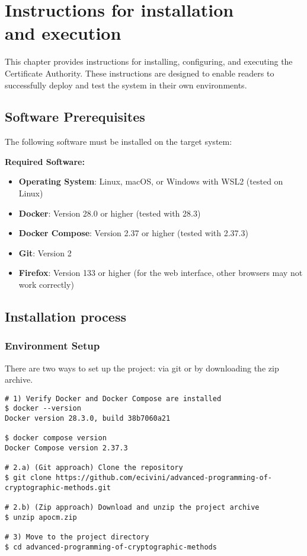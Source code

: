 \chapter{Instructions for installation \\and execution}

This chapter provides instructions for installing, configuring, and executing the 
Certificate Authority. These instructions are designed to enable readers to successfully 
deploy and test the system in their own environments.

\section{Software Prerequisites}

The following software must be installed on the target system:

\textbf{Required Software:}
\begin{itemize}
    \item \textbf{Operating System}: Linux, macOS, or Windows with WSL2 (tested on Linux)
    \item \textbf{Docker}: Version 28.0 or higher (tested with 28.3)
    \item \textbf{Docker Compose}: Version 2.37 or higher (tested with 2.37.3)
    \item \textbf{Git}: Version 2
    \item \textbf{Firefox}: Version 133 or higher (for the web interface, other browsers may not work correctly)
\end{itemize}

\section{Installation process}

\subsection{Environment Setup}
There are two ways to set up the project: via git or by downloading the zip archive. 
\begin{verbatim}
# 1) Verify Docker and Docker Compose are installed
$ docker --version
Docker version 28.3.0, build 38b7060a21

$ docker compose version
Docker Compose version 2.37.3

# 2.a) (Git approach) Clone the repository 
$ git clone https://github.com/ecivini/advanced-programming-of-cryptographic-methods.git

# 2.b) (Zip approach) Download and unzip the project archive
$ unzip apocm.zip

# 3) Move to the project directory
$ cd advanced-programming-of-cryptographic-methods
\end{verbatim}

